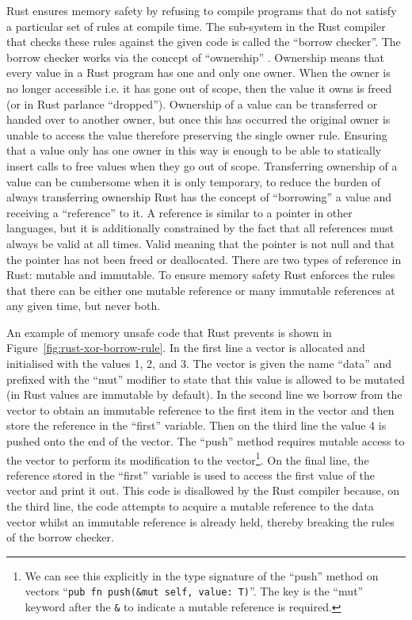 Rust ensures memory safety by refusing to compile programs that do not satisfy
a particular set of rules at compile time. The sub-system in the Rust compiler
that checks these rules against the given code is called the ``borrow
checker''. The borrow checker works via the concept of ``ownership''
\cite{rust-book-ownership}. Ownership means that every value in a Rust program
has one and only one owner. When the owner is no longer accessible i.e. it has
gone out of scope, then the value it owns is freed (or in Rust parlance
``dropped''). Ownership of a value can be transferred or handed over to another
owner, but once this has occurred the original owner is unable to access the
value therefore preserving the single owner rule. Ensuring that a value only
has one owner in this way is enough to be able to statically insert calls to
free values when they go out of scope. Transferring ownership of a value can be
cumbersome when it is only temporary, to reduce the burden of always
transferring ownership Rust has the concept of ``borrowing'' a value and
receiving a ``reference'' to it. A reference is similar to a pointer in other
languages, but it is additionally constrained by the fact that all references
must always be valid at all times. Valid meaning that the pointer is not null
and that the pointer has not been freed or deallocated. There are two types of
reference in Rust: mutable and immutable. To ensure memory safety Rust enforces
the rules that there can be either one mutable reference or many immutable
references at any given time, but never both.

An example of memory unsafe code that Rust prevents is shown in
Figure~\ref{fig:rust-xor-borrow-rule}. In the first line a vector is allocated
and initialised with the values 1, 2, and 3. The vector is given the name
``data'' and prefixed with the ``mut'' modifier to state that this value is
allowed to be mutated (in Rust values are immutable by default). In the second
line we borrow from the vector to obtain an immutable reference to the first
item in the vector and then store the reference in the ``first'' variable. Then
on the third line the value 4 is pushed onto the end of the vector. The
``push'' method requires mutable access to the vector to perform its
modification to the vector\footnote{We can see this explicitly in the type
signature of the ``push'' method on vectors ``\texttt{pub fn push(\&mut self,
value: T)}''. The key is the ``mut'' keyword after the \texttt{\&} to indicate
a mutable reference is required.}. On the final line, the reference stored in
the ``first'' variable is used to access the first value of the vector and
print it out. This code is disallowed by the Rust compiler because, on the
third line, the code attempts to acquire a mutable reference to the data vector
whilst an immutable reference is already held, thereby breaking the rules of
the borrow checker.

